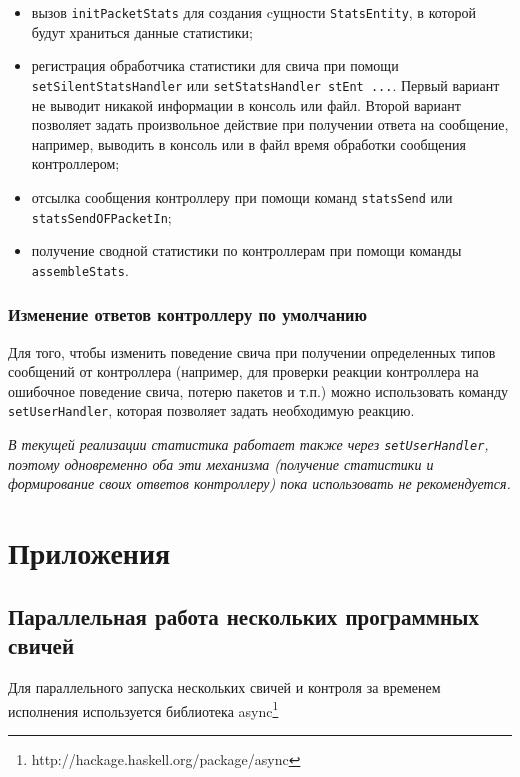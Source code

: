 \documentclass[9pt,a4paper]{article}
\begin{document}
\begin{itemize}
  \item вызов \lstinline!initPacketStats! для создания cущности
    \lstinline!StatsEntity!, в которой будут храниться данные статистики;
  \item регистрация обработчика статистики для свича при помощи
    \lstinline!setSilentStatsHandler! или \lstinline!setStatsHandler stEnt ...!.
    Первый вариант не выводит никакой информации в консоль или файл.  Второй
    вариант позволяет задать произвольное действие при получении ответа на
    сообщение, например, выводить в консоль или в файл время обработки
    сообщения контроллером;
  \item отсылка сообщения контроллеру при помощи команд \lstinline!statsSend!
    или \lstinline!statsSendOFPacketIn!;
  \item получение сводной статистики по контроллерам при помощи команды
    \lstinline!assembleStats!.
\end{itemize}

\subsubsection{Изменение ответов контроллеру по умолчанию}

Для того, чтобы изменить поведение свича при получении определенных типов
сообщений от контроллера (например, для проверки реакции контроллера на
ошибочное поведение свича, потерю пакетов и т.п.)  можно использовать команду
\lstinline!setUserHandler!, которая позволяет задать необходимую реакцию.

\emph{В текущей реализации статистика работает также через
  \lstinline!setUserHandler!, поэтому одновременно оба эти механизма (получение
  статистики и формирование своих ответов контроллеру) пока использовать не
  рекомендуется.}

\section{Приложения}

\subsection{Параллельная работа нескольких программных свичей}

Для параллельного запуска нескольких свичей и контроля за временем исполнения
используется библиотека async\footnote{http://hackage.haskell.org/package/async}
\end{document}
